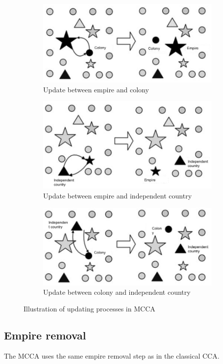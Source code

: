 \begin{figure}[h!]
	\centering
	\begin{subfigure}[b]{0.5\linewidth}
		\includegraphics[width=\linewidth]{sections/figure4a.jpg}
		\caption{Update between empire and colony}
		\label{fig:fig4a}
	\end{subfigure}
	\begin{subfigure}[b]{0.5\linewidth}
		\includegraphics[width=\linewidth]{sections/figure4b.jpg}
		\caption{Update between empire and independent country}
		\label{fig:fig4b}
	\end{subfigure}
	\begin{subfigure}[b]{0.5\linewidth}
		\includegraphics[width=\linewidth]{sections/figure4c.jpg}
		\caption{Update between colony and independent country}
		\label{fig:fig4c}
	\end{subfigure}
	\caption{Illustration of updating processes in MCCA}
	\label{fig:fig4}
\end{figure}

\subsection{Empire removal}
The MCCA uses the same empire removal step as in the classical CCA.